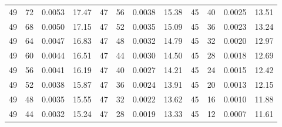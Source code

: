 \begin{tabular}{llll|llll|llll}
49 & 72 & 0.0053 & 17.47 & 47 & 56 & 0.0038 & 15.38 & 45 & 40 & 0.0025 & 13.51\\
49 & 68 & 0.0050 & 17.15 & 47 & 52 & 0.0035 & 15.09 & 45 & 36 & 0.0023 & 13.24\\
49 & 64 & 0.0047 & 16.83 & 47 & 48 & 0.0032 & 14.79 & 45 & 32 & 0.0020 & 12.97\\
49 & 60 & 0.0044 & 16.51 & 47 & 44 & 0.0030 & 14.50 & 45 & 28 & 0.0018 & 12.69\\
49 & 56 & 0.0041 & 16.19 & 47 & 40 & 0.0027 & 14.21 & 45 & 24 & 0.0015 & 12.42\\
49 & 52 & 0.0038 & 15.87 & 47 & 36 & 0.0024 & 13.91 & 45 & 20 & 0.0013 & 12.15\\
49 & 48 & 0.0035 & 15.55 & 47 & 32 & 0.0022 & 13.62 & 45 & 16 & 0.0010 & 11.88\\
49 & 44 & 0.0032 & 15.24 & 47 & 28 & 0.0019 & 13.33 & 45 & 12 & 0.0007 & 11.61\\
\bottomrule
\end{tabular}
\newpage
